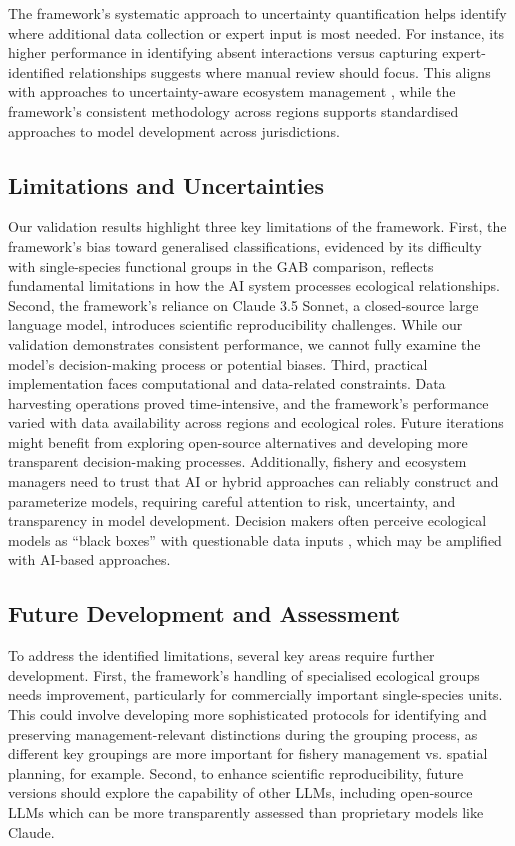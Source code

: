 The framework's systematic approach to uncertainty quantification helps identify where additional data collection or expert input is most needed. For instance, its higher performance in identifying absent interactions versus capturing expert-identified relationships suggests where manual review should focus. This aligns with approaches to uncertainty-aware ecosystem management \citep{hill2007model,link2012dealing}, while the framework's consistent methodology across regions supports standardised approaches to model development across jurisdictions.

\subsection{Limitations and Uncertainties}

Our validation results highlight three key limitations of the framework. First, the framework's bias toward generalised classifications, evidenced by its difficulty with single-species functional groups in the GAB comparison, reflects fundamental limitations in how the AI system processes ecological relationships. Second, the framework's reliance on Claude 3.5 Sonnet, a closed-source large language model, introduces scientific reproducibility challenges. While our validation demonstrates consistent performance, we cannot fully examine the model's decision-making process or potential biases. Third, practical implementation faces computational and data-related constraints. Data harvesting operations proved time-intensive, and the framework's performance varied with data availability across regions and ecological roles. Future iterations might benefit from exploring open-source alternatives \citep{Kommineni2024} and developing more transparent decision-making processes. Additionally, fishery and ecosystem managers need to trust that AI or hybrid approaches can reliably construct and parameterize models, requiring careful attention to risk, uncertainty, and transparency in model development. Decision makers often perceive ecological models as ``black boxes'' with questionable data inputs \citep{boschetti2018decision}, which may be amplified with AI-based approaches.


\subsection{Future Development and Assessment}

To address the identified limitations, several key areas require further development. First, the framework's handling of specialised ecological groups needs improvement, particularly for commercially important single-species units. This could involve developing more sophisticated protocols for identifying and preserving management-relevant distinctions during the grouping process, as different key groupings are more important for fishery management vs. spatial planning, for example. Second, to enhance scientific reproducibility, future versions should explore the capability of other LLMs, including open-source LLMs which can be more transparently assessed than proprietary models like Claude.

